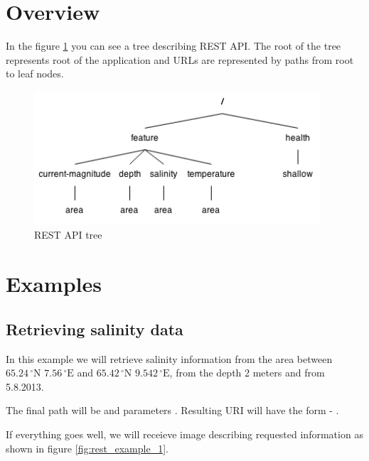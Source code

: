 \documentclass[11pt,a4paper,titlepage,oneside]{report}
\begin{document}
\section{Overview}

In the figure \ref{fig:rest_api_tree} you can see a tree describing REST \gls{API}. The root of the tree represents root of the application and \gls{URL}s are represented by paths from root to leaf nodes.

\begin{figure}[h]
	\centering
	\includegraphics[height=5cm]{img/REST_API.png}
	\caption{REST API tree}
	\label{fig:rest_api_tree}
\end{figure}

\section{Examples}

\subsection{Retrieving salinity data}
\label{subsec:rest_example_salinity}
In this example we will retrieve salinity information from the area between $65.24\,^{\circ}\mathrm{N}$ $7.56\,^{\circ}\mathrm{E}$ and $65.42\,^{\circ}\mathrm{N}$ $9.542\,^{\circ}\mathrm{E}$, from the depth 2 meters and from 5.8.2013.

The final path will be  and parameters . Resulting URI will have the form - .

If everything goes well, we will receieve image describing requested information as shown in figure \ref{fig:rest_example_1}.
\end{document}
